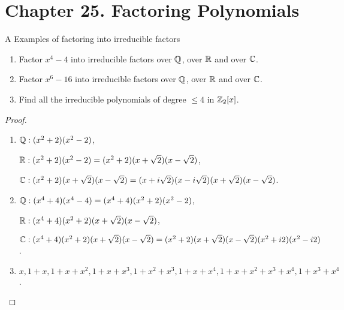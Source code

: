 \section*{Chapter 25. Factoring Polynomials}


\begin{exercise}{A Examples of factoring into irreducible factors}
\begin{enumerate}
    \item Factor $x^4-4$ into irreducible factors over $\mathbb{Q}$, over $\mathbb{R}$ and over $\mathbb{C}$.
    \item Factor $x^6-16$ into irreducible factors over $\mathbb{Q}$, over $\mathbb{R}$ and over $\mathbb{C}$.
    \item Find all the irreducible polynomials of degree $\leq 4$ in $\mathbb{Z}_2[x]$.
\end{enumerate}
\end{exercise}
\begin{proof}
 \begin{enumerate}
     \item $\mathbb{Q}: (x^2+2)(x^2-2)$,
     
     $\mathbb{R}: (x^2+2)(x^2-2)=(x^2+2)(x+\sqrt{2})(x-\sqrt{2})$, 
     
     $\mathbb{C}: (x^2+2)(x+\sqrt{2})(x-\sqrt{2})=(x+i\sqrt{2})(x-i\sqrt{2})(x+\sqrt{2})(x-\sqrt{2})$.
     \item $\mathbb{Q}: (x^4+4)(x^4-4)=(x^4+4)(x^2+2)(x^2-2)$,
     
     $\mathbb{R}: (x^4+4)(x^2+2)(x+\sqrt{2})(x-\sqrt{2})$,
     
     $\mathbb{C}:(x^4+4)(x^2+2)(x+\sqrt{2})(x-\sqrt{2})=(x^2+2)(x+\sqrt{2})(x-\sqrt{2})(x^2+i2)(x^2-i2)$.
     \item $x, 1+x, 1+x+x^2, 1+x+x^3, 1+x^2+x^3, 1+x+x^4, 1+x+x^2+x^3+x^4, 1+x^3+x^4$.
 \end{enumerate}
\end{proof}

